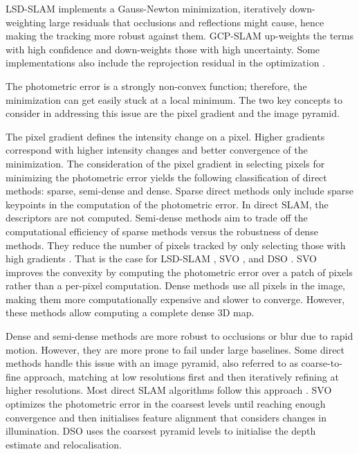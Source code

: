 LSD-SLAM \cite{engel2014lsd} implements a Gauss-Newton minimization, iteratively down-weighting large residuals that occlusions and reflections might cause, hence making the tracking more robust against them. GCP-SLAM \cite{zhang2019gcpslam} up-weights the terms with high confidence and down-weights those with high uncertainty.
Some implementations also include the reprojection residual in the optimization \cite{zhang2019gcpslam} \cite{zhao2019robust}. 

The photometric error is a strongly non-convex function; therefore, the minimization can get easily stuck at a local minimum. The two key concepts to consider in addressing this issue are the pixel gradient and the image pyramid.

The pixel gradient defines the intensity change on a pixel. Higher gradients correspond with higher intensity changes and better convergence of the minimization. 
The consideration of the pixel gradient in selecting pixels for minimizing the photometric error yields the following classification of direct methods: sparse, semi-dense and dense.
Sparse direct methods only include sparse keypoints in the computation of the photometric error. In direct SLAM, the descriptors are not computed. 
Semi-dense methods aim to trade off the computational efficiency of sparse methods versus the robustness of dense methods. They reduce the number of pixels tracked by only selecting those with high gradients \cite{forster2014svo}. That is the case for LSD-SLAM \cite{engel2014lsd}, SVO \cite{forster2014svo}, and DSO \cite{engel2017dso}. SVO improves the convexity by computing the photometric error over a patch of pixels rather than a per-pixel computation. 
Dense methods use all pixels in the image, making them more computationally expensive and slower to converge. However, these methods allow computing a complete dense 3D map.  


Dense and semi-dense methods are more robust to occlusions or blur due to rapid motion. However, they are more prone to fail under large baselines. Some direct methods handle this issue with an image pyramid, also referred to as coarse-to-fine approach, matching at low resolutions first and then iteratively refining at higher resolutions. Most direct SLAM algorithms follow this approach \cite{klein2007dtam,engel2014lsd,forster2014svo,engel2017dso}. SVO optimizes the photometric error in the coarsest levels until reaching enough convergence and then initialises feature alignment that considers changes in illumination. DSO uses the coarsest pyramid levels to initialise the depth estimate and relocalisation.




